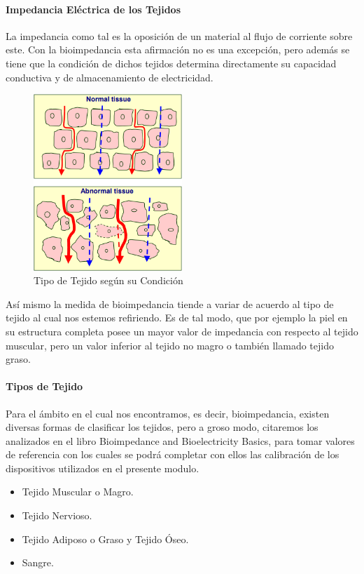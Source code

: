 \documentclass[12pt,letterpaper,spanish]{article}
\begin{document}
				\paragraph{Impedancia Eléctrica de los Tejidos}
				\hfill\break
				La impedancia como tal  es la oposición de un material al flujo de corriente sobre este. Con la bioimpedancia esta afirmación no es una excepción, pero además se tiene que la condición de dichos tejidos determina directamente su capacidad conductiva y de almacenamiento de electricidad.
			
				\begin{figure}[H]
					\centering
					\includegraphics[width=0.5\textwidth]{./Imagenes/Tejido.png}
					\caption{Tipo de Tejido según su Condición}
				\end{figure}
			
				Así mismo la medida de bioimpedancia tiende a variar de acuerdo al tipo de tejido al cual nos estemos refiriendo. Es de tal modo, que por ejemplo la piel en su estructura completa posee un mayor valor de impedancia con respecto al tejido muscular, pero un valor inferior al tejido no magro o también llamado tejido graso.
				\paragraph{Tipos de Tejido}
				\hfill\break
				Para el ámbito en el cual nos encontramos, es decir, bioimpedancia, existen diversas formas de clasificar los tejidos, pero a groso modo, citaremos los analizados en el libro Bioimpedance and Bioelectricity Basics, para tomar valores de referencia con los cuales se podrá completar con ellos las calibración de los dispositivos utilizados en el presente modulo.
			
				\begin{itemize}
					\item Tejido Muscular o Magro.
					\item Tejido Nervioso.
				 	\item Tejido Adiposo o Graso y Tejido Óseo.
					\item Sangre.
				\end{itemize}
			
\end{document}
